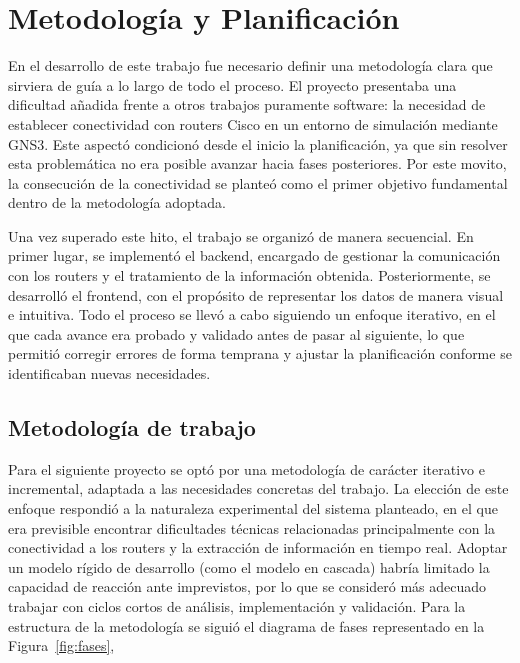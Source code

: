
\chapter{Metodología y Planificación}

En el desarrollo de este trabajo fue necesario definir una metodología clara que sirviera de guía a lo largo de todo el proceso. El proyecto presentaba una dificultad añadida frente a otros trabajos puramente software: la necesidad de establecer conectividad con routers Cisco en un entorno de simulación mediante GNS3. Este aspectó condicionó desde el inicio la planificación, ya que sin resolver esta problemática no era posible avanzar hacia fases posteriores. Por este movito, la consecución de la conectividad se planteó como el primer objetivo fundamental dentro de la metodología adoptada.

Una vez superado este hito, el trabajo se organizó de manera secuencial. En primer lugar, se implementó el backend, encargado de gestionar la comunicación con los routers y el tratamiento de la información obtenida. Posteriormente, se desarrolló el frontend, con el propósito de representar los datos de manera visual e intuitiva. Todo el proceso se llevó a cabo siguiendo un enfoque iterativo, en el que cada avance era probado y validado antes de pasar al siguiente, lo que permitió corregir errores de forma temprana y ajustar la planificación conforme se identificaban nuevas necesidades.

\section{Metodología de trabajo}

Para el siguiente proyecto se optó por una metodología de carácter iterativo e incremental, adaptada a las necesidades concretas del trabajo. La elección de este enfoque respondió a la naturaleza experimental del sistema planteado, en el que era previsible encontrar dificultades técnicas relacionadas principalmente con la conectividad a los routers y la extracción de información en tiempo real. Adoptar un modelo rígido de desarrollo (como el modelo en cascada) habría limitado la capacidad de reacción ante imprevistos, por lo que se consideró más adecuado trabajar con ciclos cortos de análisis, implementación y validación. Para la estructura de la metodología se siguió el diagrama de fases representado en la Figura~\ref{fig:fases},


